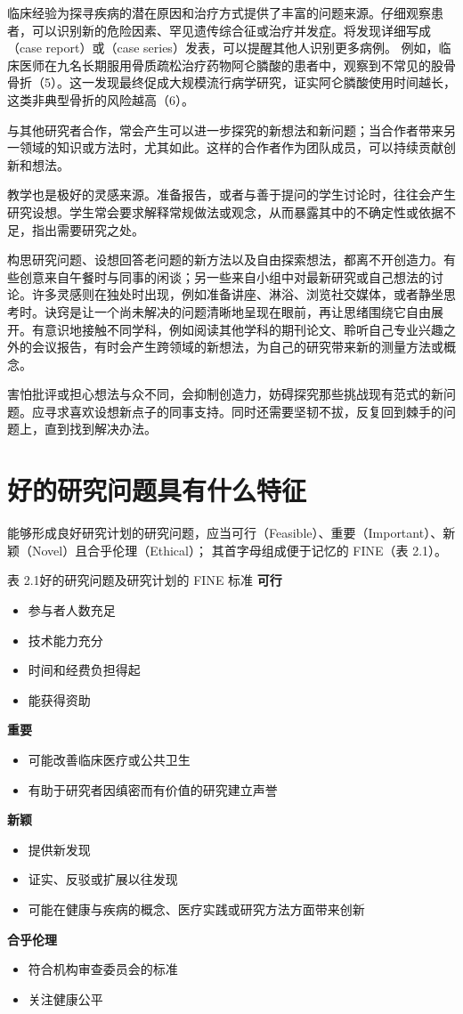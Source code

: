 临床经验为探寻疾病的潜在原因和治疗方式提供了丰富的问题来源。仔细观察患者，可以识别新的危险因素、罕见遗传综合征或治疗并发症。将发现详细写成（case report）或（case series）发表，可以提醒其他人识别更多病例。
例如，临床医师在九名长期服用骨质疏松治疗药物阿仑膦酸的患者中，观察到不常见的股骨骨折（5）。这一发现最终促成大规模流行病学研究，证实阿仑膦酸使用时间越长，这类非典型骨折的风险越高（6）。

与其他研究者合作，常会产生可以进一步探究的新想法和新问题；当合作者带来另一领域的知识或方法时，尤其如此。这样的合作者作为团队成员，可以持续贡献创新和想法。

教学也是极好的灵感来源。准备报告，或者与善于提问的学生讨论时，往往会产生研究设想。学生常会要求解释常规做法或观念，从而暴露其中的不确定性或依据不足，指出需要研究之处。

构思研究问题、设想回答老问题的新方法以及自由探索想法，都离不开创造力。有些创意来自午餐时与同事的闲谈；另一些来自小组中对最新研究或自己想法的讨论。许多灵感则在独处时出现，例如准备讲座、淋浴、浏览社交媒体，或者静坐思考时。诀窍是让一个尚未解决的问题清晰地呈现在眼前，再让思绪围绕它自由展开。有意识地接触不同学科，例如阅读其他学科的期刊论文、聆听自己专业兴趣之外的会议报告，有时会产生跨领域的新想法，为自己的研究带来新的测量方法或概念。

害怕批评或担心想法与众不同，会抑制创造力，妨碍探究那些挑战现有范式的新问题。应寻求喜欢设想新点子的同事支持。同时还需要坚韧不拔，反复回到棘手的问题上，直到找到解决办法。

\section{好的研究问题具有什么特征}
能够形成良好研究计划的研究问题，应当可行（Feasible）、重要（Important）、新颖（Novel）且合乎伦理（Ethical）；
其首字母组成便于记忆的 FINE（表 2.1）。
\begin{bookbox}{表 2.1\quad 好的研究问题及研究计划的 FINE 标准}
\textbf{可行}
\begin{itemize}\item 参与者人数充足\item 技术能力充分\item 时间和经费负担得起\item 能获得资助\end{itemize}
\textbf{重要}
\begin{itemize}\item 可能改善临床医疗或公共卫生\item 有助于研究者因缜密而有价值的研究建立声誉\end{itemize}
\textbf{新颖}
\begin{itemize}\item 提供新发现\item 证实、反驳或扩展以往发现\item 可能在健康与疾病的概念、医疗实践或研究方法方面带来创新\end{itemize}
\textbf{合乎伦理}
\begin{itemize}\item 符合机构审查委员会的标准\item 关注健康公平\end{itemize}
\end{bookbox}

